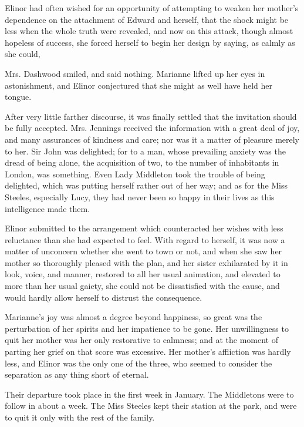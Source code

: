 Elinor had often wished for an opportunity of attempting to weaken her mother's dependence on the attachment of Edward and herself, that the shock might be less when the whole truth were revealed, and now on this attack, though almost hopeless of success, she forced herself to begin her design by saying, as calmly as she could, 

Mrs. Dashwood smiled, and said nothing. Marianne lifted up her eyes in astonishment, and Elinor conjectured that she might as well have held her tongue.

After very little farther discourse, it was finally settled that the invitation should be fully accepted. Mrs. Jennings received the information with a great deal of joy, and many assurances of kindness and care; nor was it a matter of pleasure merely to her. Sir John was delighted; for to a man, whose prevailing anxiety was the dread of being alone, the acquisition of two, to the number of inhabitants in London, was something. Even Lady Middleton took the trouble of being delighted, which was putting herself rather out of her way; and as for the Miss Steeles, especially Lucy, they had never been so happy in their lives as this intelligence made them.

Elinor submitted to the arrangement which counteracted her wishes with less reluctance than she had expected to feel. With regard to herself, it was now a matter of unconcern whether she went to town or not, and when she saw her mother so thoroughly pleased with the plan, and her sister exhilarated by it in look, voice, and manner, restored to all her usual animation, and elevated to more than her usual gaiety, she could not be dissatisfied with the cause, and would hardly allow herself to distrust the consequence.

Marianne's joy was almost a degree beyond happiness, so great was the perturbation of her spirits and her impatience to be gone. Her unwillingness to quit her mother was her only restorative to calmness; and at the moment of parting her grief on that score was excessive. Her mother's affliction was hardly less, and Elinor was the only one of the three, who seemed to consider the separation as any thing short of eternal.

Their departure took place in the first week in January. The Middletons were to follow in about a week. The Miss Steeles kept their station at the park, and were to quit it only with the rest of the family.


